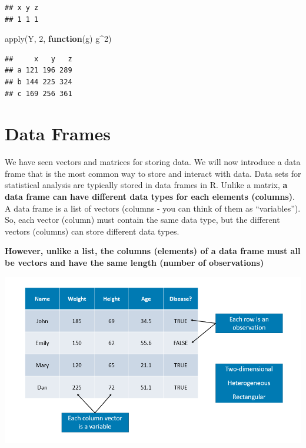 \documentclass[
]{book}
\newenvironment{Shaded}{\begin{snugshade}}{\end{snugshade}}
\newcommand{\ControlFlowTok}[1]{\textcolor[rgb]{0.13,0.29,0.53}{\textbf{#1}}}
\newcommand{\DecValTok}[1]{\textcolor[rgb]{0.00,0.00,0.81}{#1}}
\newcommand{\FunctionTok}[1]{\textcolor[rgb]{0.00,0.00,0.00}{#1}}
\newcommand{\NormalTok}[1]{#1}
\newcommand{\SpecialCharTok}[1]{\textcolor[rgb]{0.00,0.00,0.00}{#1}}
\theoremstyle{definition}
\theoremstyle{definition}
\theoremstyle{definition}
\theoremstyle{definition}
\theoremstyle{remark}
\begin{document}
\begin{verbatim}
## x y z 
## 1 1 1
\end{verbatim}

\begin{Shaded}
\begin{Highlighting}[]
\FunctionTok{apply}\NormalTok{(Y, }\DecValTok{2}\NormalTok{, }\ControlFlowTok{function}\NormalTok{(g) g}\SpecialCharTok{\^{}}\DecValTok{2}\NormalTok{)}
\end{Highlighting}
\end{Shaded}

\begin{verbatim}
##     x   y   z
## a 121 196 289
## b 144 225 324
## c 169 256 361
\end{verbatim}

\hypertarget{data-frames}{%
\section{Data Frames}\label{data-frames}}

We have seen vectors and matrices for storing data. We will now introduce a data frame that is the most common way to store and interact with data. Data sets for statistical analysis are typically stored in data frames in R. Unlike a matrix, \textbf{a data frame can have different data types for each elements (columns)}. A data frame is a list of vectors (columns - you can think of them as ``variables''). So, each vector (column) must contain the same data type, but the different vectors (columns) can store different data types.

\textbf{However, unlike a list, the columns (elements) of a data frame must all be vectors and have the same length (number of observations)}

\includegraphics[width=13.56in]{png/dataframe}
\end{document}
